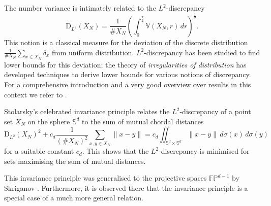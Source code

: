 \begin{remark}
  The number variance is intimately related to the $L^2$-discrepancy
  \begin{equation*}
    \mathrm{D}_{L^2}(X_N)=\frac1{\#X_N}
    \left(\int_0^{\frac\pi2}\mathbb{V}(X_N,r)\,dr\right)^{\frac12}.
  \end{equation*}
  This notion is a classical measure for the deviation of the discrete
  distribution $\frac1{\#X_N}\sum_{x\in X_N}\delta_x$ from uniform
  distribution. $L^2$-discrepancy has been studied to find lower bounds for this
  deviation; the theory of \emph{irregularities of distribution} has developed
  techniques to derive lower bounds for various notions of discrepancy. For a
  comprehensive introduction and a very good overview over results in this
  context we refer to \cite{Beck_Chen2008:irregularities_distribution}.
\end{remark}
\begin{remark}\label{rem:invariance}
  Stolarsky's celebrated invariance principle
  \cite{Stolarsky1973:sums_distances_sphere} relates the $L^2$-discrepancy of
  a point set $X_N$ on the sphere $\mathbb{S}^d$ to the sum of mutual chordal
  distances
  \begin{equation}\label{eq:invariance}
    \mathrm{D}_{L^2}(X_N)^2+c_d\frac1{(\#X_N)^2}\sum_{x,y\in X_N}\|x-y\|=
    c_d\iint_{\mathbb{S}^d\times\mathbb{S}^d}\|x-y\|\,d\sigma(x)\,d\sigma(y)
  \end{equation}
  for a suitable constant $c_d$. This shows that the $L^2$-discrepancy is
  minimised for sets maximising the sum of mutual distances.

  This invariance principle was generalised to the projective spaces
  $\mathbb{FP}^{d-1}$ by Skriganov
  \cite{Skriganov2020:stolarskys_invariance_principle}. Furthermore, it is
  observed there that the invariance principle is a special case of a much more
  general relation.
\end{remark}

